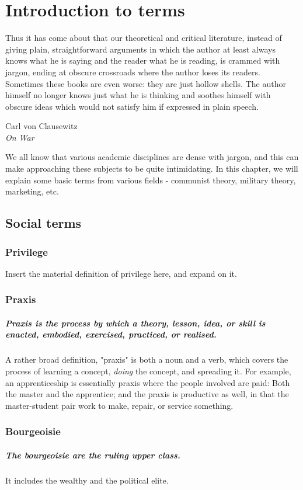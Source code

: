 \chapter{Introduction to terms}
    \epigraph{Thus it has come about that our theoretical and critical literature, instead of giving plain, straightforward arguments in which the author at least always knows what he is saying and the reader what he is reading, is crammed with jargon, ending at obscure crossroads where the author loses its readers. Sometimes these books are even worse: they are just hollow shells. The author himself no longer knows just what he is thinking and soothes himself with obscure ideas which would not satisfy him if expressed in plain speech.}{Carl von Clausewitz\\ \textit{On War}}
    We all know that various academic disciplines are dense with jargon, and this can make approaching these subjects to be quite intimidating. In this chapter, we will explain some basic terms from various fields - communist theory, military theory, marketing, etc. 
  \section{Social terms}
    \subsection{Privilege}
     Insert the material definition of privilege here, and expand on it.
    \subsection{Praxis}
    \paragraph{Praxis is the process by which a theory, lesson, idea, or skill is enacted, embodied, exercised, practiced, or realised.} A rather broad definition, "praxis" is both a noun and a verb, which covers the process of learning a concept, \textit{doing} the concept, and spreading it. For example, an apprenticeship is essentially praxis where the people involved are paid: Both the master and the apprentice; and the praxis is productive as well, in that the master-student pair work to make, repair, or service something.
    \subsection{Bourgeoisie}
      \paragraph{The bourgeoisie are the ruling upper class.} It includes the wealthy and the political elite. 
